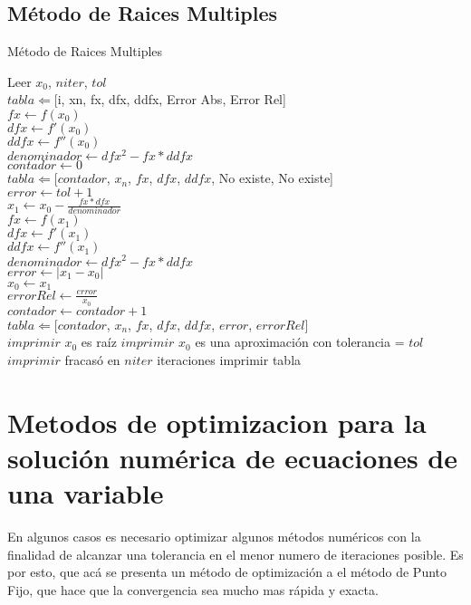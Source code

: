 \documentclass[12pt]{article}
\begin{document}
	\subsection{Método de Raices Multiples}
    \begin{algorithm}[H]
        \caption{Método de Raices Multiples}
        \SetAlgoLined
		Leer $x_0$, $niter$, $tol$ \\
		$tabla \Leftarrow $[i, xn, fx, dfx, ddfx, Error Abs, Error Rel] \\
        $fx \leftarrow f(x_{0})$ \\
        $dfx \leftarrow f'(x_{0})$ \\
        $ddfx \leftarrow f''(x_{0})$ \\
        $denominador \leftarrow dfx^2 - fx * ddfx$\\
		$contador \leftarrow 0$ \\
		$tabla \Leftarrow $[$contador$, $x_n$, $fx$, $dfx$, $ddfx$, No existe, No existe] \\
        $error \leftarrow tol + 1$ \\
        {
            $x_{1} \leftarrow x_{0} - \frac{fx * dfx}{denominador}$ \\ 
            $fx \leftarrow f(x_{1})$ \\ 
            $dfx \leftarrow f'(x_{1})$ \\
            $ddfx \leftarrow f''(x_{1})$\\
            $denominador \leftarrow dfx^2 - fx * ddfx$\\
			$error \leftarrow |x_{1} - x_{0}|$\\
			$x_{0} \leftarrow x_{1}$\\
			$error Rel \leftarrow \frac{error}{x_{0}} $\\
			$contador \leftarrow contador + 1$\\
			$tabla \Leftarrow $[$contador$, $x_n$, $fx$, $dfx$, $ddfx$, $error$, $error Rel$] \\
        }
            {$imprimir$ $x_{0}$ es raíz}
            {$imprimir$ $x_{0}$ es una aproximación con tolerancia = $tol$}
            \Else
			{$imprimir$ fracasó en $niter$ iteraciones}
			imprimir tabla
	\end{algorithm}
	
	\section{Metodos de optimizacion para la solución numérica de ecuaciones de una variable}
	En algunos casos es necesario optimizar algunos métodos numéricos con la finalidad de alcanzar una tolerancia en el menor numero de iteraciones posible. Es por esto, que acá se presenta un método de optimización a el método de Punto Fijo, que hace que la convergencia sea mucho mas rápida y exacta.
	
\end{document}
